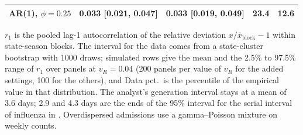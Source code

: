 \begin{table}[htbp]
\begin{tabular}{lllll}
AR(1), $\phi=0.25$ & 0.033 [0.021, 0.047] & 0.033 [0.019, 0.049] & 23.4 & 12.6 \\
\bottomrule
\end{tabular}
\par\smallskip
\begin{minipage}{0.95\linewidth}\scriptsize $r_1$ is the pooled lag-1 autocorrelation of the relative deviation $x/\bar{x}_{\mathrm{block}}-1$ within state-season blocks. The interval for the data comes from a state-cluster bootstrap with 1000 draws; simulated rows give the mean and the 2.5\% to 97.5\% range of $r_1$ over panels at $v_R=0.04$ (200 panels per value of $v_R$ for the added settings, 100 for the others), and Data pct.\ is the percentile of the empirical value in that distribution. The analyst's generation interval stays at a mean of 3.6 days; 2.9 and 4.3 days are the ends of the 95\% interval for the serial interval of influenza in \citet{cowling2009estimation}. Overdispersed admissions use a gamma--Poisson mixture on weekly counts.\end{minipage}
\end{table}
